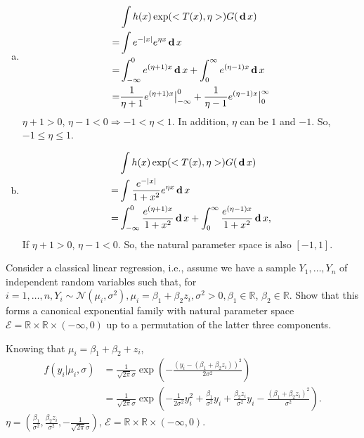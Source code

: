 \begin{solution}
    \begin{enumerate}[(a)]
        \item \begin{align*}
            &\int h(x)\exp(<T(x), \eta>)G(\,\mathbf{d}\, x)\\
            =&{}\int e^{-|x|}e^{\eta x}\,\mathbf{d}\, x\\
            =&{}\int_{-\infty}^0 e^{(\eta+1) x}\,\mathbf{d}\, x+ \int_{0}^\infty e^{(\eta-1) x}\,\mathbf{d}\, x\\
            =&{}\frac{1}{\eta+1}e^{(\eta+1) x}\big|_{-\infty}^0+\frac{1}{\eta-1}e^{(\eta-1)x}\big|_0^{\infty}
        \end{align*}
        $\eta+1>0$, $\eta-1<0\Rightarrow -1<\eta<1$. In addition, $\eta$ can be $1$ and $-1$. So, $-1\leqslant\eta\leqslant1$. 
        \item \begin{align*}
            &\int h(x)\exp(<T(x), \eta>)G(\,\mathbf{d}\, x)\\
            =&{}\int \frac{e^{-|x|}}{1+x^2}e^{\eta x}\,\mathbf{d}\, x\\
            =&{}\int_{-\infty}^0 \frac{e^{(\eta+1) x}}{1+x^2}\,\mathbf{d}\, x+ \int_{0}^\infty \frac{e^{(\eta-1) x}}{1+x^2}\,\mathbf{d}\, x, 
        \end{align*}
        If $\eta+1>0$, $\eta-1<0$. So, the natural parameter space is also $[-1,1]$. 
    \end{enumerate}
\end{solution}


\begin{exercise}
    Consider a classical linear regression, i.e., assume we have a sample \(Y_{1}, \ldots, Y_{n}\) of independent random variables such that, for \(i=1, \ldots, n, Y_{i} \sim \mathcal{N}\left(\mu_{i}, \sigma^{2}\right), \mu_{i}=\beta_{1}+\beta_{2} z_{i}, \sigma^{2}>0, \beta_{1} \in \mathbb{R}\), \(\beta_{2} \in \mathbb{R}\). Show that this forms a canonical exponential family with natural parameter space \(\mathcal{E}=\mathbb{R} \times \mathbb{R} \times(-\infty, 0)\) up to a permutation of the latter three components.
\end{exercise}

\begin{solution}
    Knowing that $\mu_i=\beta_1+\beta_2+z_i$, 
    \begin{align*}
        f(y_i|\mu_i,\sigma)&=\frac{1}{\sqrt{2\pi}\sigma}\exp\left(-\frac{(y_i-(\beta_1+\beta_2z_i))^2}{2\sigma^2}\right)\\
        &=\frac{1}{\sqrt{2\pi}\sigma}\exp\left(-\frac{1}{2\sigma^2}y_i^2+\frac{\beta_1}{\sigma^2}y_i+\frac{\beta_2z_i}{\sigma^2}y_i-\frac{(\beta_1+\beta_2z_i)^2}{\sigma^2}\right). 
    \end{align*}
    $\eta=(\frac{\beta_1}{\sigma^2}, \frac{\beta_2z_i}{\sigma^2}, -\frac{1}{\sqrt{2\pi}\sigma})$, $\mathcal{E}=\mathbb{R}\times\mathbb{R}\times(-\infty,0)$. 
\end{solution}